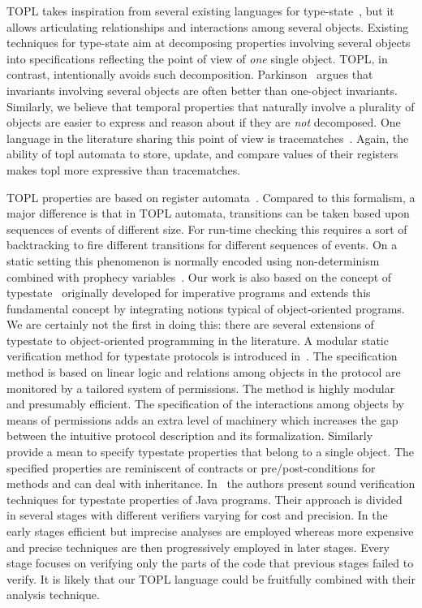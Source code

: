 \documentclass[10pt, preprint]{sigplanconf} %
\begin{document}
TOPL takes inspiration from several existing  languages for type-state~\cite{strom1986,dblp:conf/oopsla/bierhoffa07,dblp:conf/oopsla/naeeml08,disney2011,ball2002}, but  it allows articulating  relationships and interactions among several objects.
Existing techniques for type-state aim at decomposing properties involving several objects into specifications reflecting the point of view of {\em one} single object.
TOPL, in contrast,  intentionally avoids such decomposition.
Parkinson~\cite{parkinson-iwaco2007} argues that invariants involving several objects are often better than one-object invariants.
Similarly, we believe that temporal properties that naturally involve a plurality of objects are easier to express and reason about if they are \emph{not} decomposed.
One language in the literature sharing this point of view is tracematches~\cite{dblp:conf/oopsla/allanachklmsst05}.
Again, the ability of topl automata to store,  update, and compare values of their registers makes topl more expressive than tracematches.

TOPL properties are based on register automata~\cite{dblp:journals/tocl/demril09}.
Compared to this formalism, a major difference is that in TOPL automata, transitions can be taken based upon sequences of events of different size.
For run-time checking this requires a sort of backtracking to fire different transitions for different  sequences of events.
On a static setting this phenomenon is normally encoded using non-determinism combined with prophecy variables~\cite{dblp:journals/tcs/abadil91}.
Our work is also based on the concept of typestate~\cite{strom1986} originally developed for imperative programs and extends this fundamental concept by integrating notions typical of object-oriented programs.
We are certainly not the first in doing this: there are several extensions of typestate to object-oriented programming in the literature.
A modular static verification method for typestate protocols is introduced in~\cite{dblp:conf/oopsla/bierhoffa07}.
The specification method is based on linear logic and relations among objects in the protocol are monitored by a tailored system of permissions.
The method is highly modular and presumably efficient.
The specification of the interactions among objects by means of permissions adds an extra level of machinery which increases the gap between the intuitive protocol description and its formalization.
Similarly~\cite{deline2004,dblp:conf/sigsoft/BierhoffA05} provide a mean to specify typestate properties that belong to a single object.
The specified properties are reminiscent of contracts or pre/post-conditions for methods and can deal with inheritance.
In~\cite{dblp:conf/issta/FinkYDRG06} the authors present sound verification techniques for typestate properties of Java  programs.
Their approach is divided in several stages with different verifiers varying for cost and precision.
In the early stages efficient but imprecise analyses are employed whereas more expensive and precise techniques are then progressively employed in later stages.
Every stage focuses on verifying only the parts of the code that previous stages failed to verify.
It is likely that our TOPL language could be fruitfully combined with their analysis technique.
\end{document}
